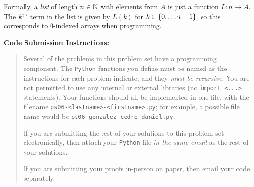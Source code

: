 \begin{remark}
    Formally, a \emph{list} of length $n \in \mathbb{N}$ with elements from $A$ is just a function $L: n \to A$.
    The $k\textsuperscript{th}$ term in the list is given by $L(k)$ for $k \in \set*{0, \dots n - 1}$,
    so this corresponds to $0$-indexed arrays when programming.
\end{remark}

\textbf{Code Submission Instructions:}
\begin{quote}
    \vspace{-\parskip}
    Several of the problems in this problem set have a programming component.
    The \texttt{Python} functions you define
    must be named as the instructions for each problem indicate,
    and they \emph{must be recursive}.
    You are not permitted to use any internal or external libraries
    (\ie no \texttt{import <...>} statements).
    Your functions should all be implemented in one file,
    with the filename \texttt{ps06-<lastname>-<firstname>.py};
    for example, a possible file name would be \texttt{ps06-gonzalez-cedre-daniel.py}.

    If you are submitting the rest of your solutions to this problem set electronically,
    then attach your \texttt{Python} file \emph{in the same email}
    as the rest of your solutions.

    If you are submitting your proofs in-person on paper, then email your code separately.
\end{quote}

